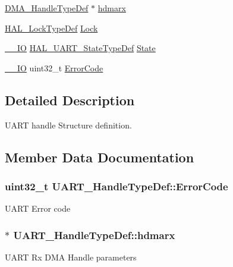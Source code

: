 \begin{DoxyCompactItemize}
\hyperlink{group___d_m_a___exported___types_ga41b754a906b86bce54dc79938970138b}{D\+M\+A\+\_\+\+Handle\+Type\+Def} $\ast$ \hyperlink{struct_u_a_r_t___handle_type_def_a11b3ba9d871b8a607b5eb00bf468e3ef}{hdmarx}
\item 
\hyperlink{stm32f4xx__hal__def_8h_ab367482e943333a1299294eadaad284b}{H\+A\+L\+\_\+\+Lock\+Type\+Def} \hyperlink{struct_u_a_r_t___handle_type_def_acf20ded14a90f4f8053abb7ad61c62b0}{Lock}
\item 
\hyperlink{core__sc300_8h_aec43007d9998a0a0e01faede4133d6be}{\+\_\+\+\_\+\+IO} \hyperlink{group___u_a_r_t___exported___types_gaf55d844a35379c204c90be5d1e8e50ba}{H\+A\+L\+\_\+\+U\+A\+R\+T\+\_\+\+State\+Type\+Def} \hyperlink{struct_u_a_r_t___handle_type_def_a61f2d1d0228c38b6e1e32eed80dbf0c8}{State}
\item 
\hyperlink{core__sc300_8h_aec43007d9998a0a0e01faede4133d6be}{\+\_\+\+\_\+\+IO} uint32\+\_\+t \hyperlink{struct_u_a_r_t___handle_type_def_ab8ce937b317c505d83b31c94d5af6db8}{Error\+Code}
\end{DoxyCompactItemize}


\subsection{Detailed Description}
U\+A\+RT handle Structure definition. 

\subsection{Member Data Documentation}
\subsubsection[{\texorpdfstring{Error\+Code}{ErrorCode}}]{ uint32\+\_\+t U\+A\+R\+T\+\_\+\+Handle\+Type\+Def\+::\+Error\+Code}\hypertarget{struct_u_a_r_t___handle_type_def_ab8ce937b317c505d83b31c94d5af6db8}{}\label{struct_u_a_r_t___handle_type_def_ab8ce937b317c505d83b31c94d5af6db8}
U\+A\+RT Error code 
\subsubsection[{\texorpdfstring{hdmarx}{hdmarx}}]{$\ast$ U\+A\+R\+T\+\_\+\+Handle\+Type\+Def\+::hdmarx}\hypertarget{struct_u_a_r_t___handle_type_def_a11b3ba9d871b8a607b5eb00bf468e3ef}{}\label{struct_u_a_r_t___handle_type_def_a11b3ba9d871b8a607b5eb00bf468e3ef}
U\+A\+RT Rx D\+MA Handle parameters 

